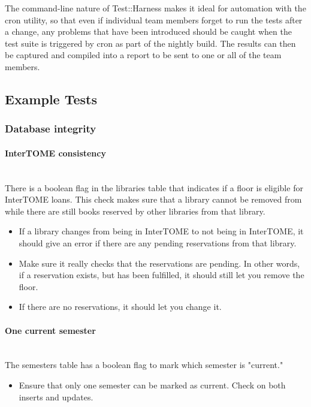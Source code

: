 \documentclass[12pt,titlepage]{article}
\begin{document}
The command-line nature of Test::Harness makes it ideal for automation with the cron utility, so that even if individual team members forget to run the tests after a change, any problems that have been introduced should be caught when the test suite is triggered by cron as part of the nightly build.  The results can then be captured and compiled into a report to be sent to one or all of the team members.

\subsection{Example Tests}
\subsubsection{Database integrity}
\paragraph{InterTOME consistency} 
\hspace{1pt}\\ There is a boolean flag in the libraries table that indicates if a floor is eligible for InterTOME loans. This check makes sure that a library cannot be removed from while there are still books reserved by other libraries from that library.
\begin{itemize}
	\item If a library changes from being in InterTOME to not being in InterTOME, it should give an error if there are any pending reservations from that library.
	\item Make sure it really checks that the reservations are pending. In other words, if a reservation exists, but has been fulfilled, it should still let you remove the floor.
	\item If there are no reservations, it should let you change it.
\end{itemize}

\paragraph{One current semester}
\hspace{1pt}\\ The semesters table has a boolean flag to mark which semester is "current."
\begin{itemize}
	\item Ensure that only one semester can be marked as current. Check on both inserts and updates.
\end{itemize}
\end{document}
